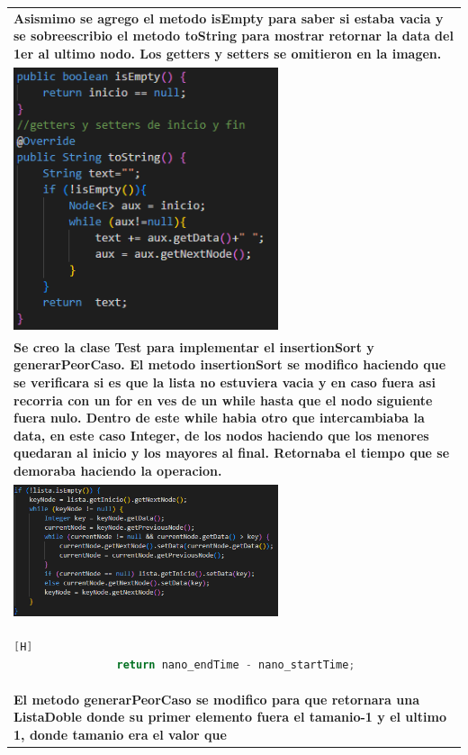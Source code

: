 \documentclass{article}
\begin{document}
\begin{longtable}{|p{15cm}|}
			\textbf{Asismimo se agrego el metodo isEmpty para saber si estaba vacia 
			y se sobreescribio el metodo toString para mostrar retornar la data 
			del 1er al ultimo nodo. Los getters y setters se omitieron en la imagen.}\\
			\includegraphics[width=0.6\textwidth,keepaspectratio]{img/otros.png}\\
			\textbf{Se creo la clase Test  para implementar el insertionSort y generarPeorCaso.
			El metodo insertionSort se modifico haciendo que se verificara si es que 
			la lista no estuviera vacia y en caso fuera asi recorria con un 
			for en ves de un while hasta que el nodo siguiente fuera nulo. Dentro de este while
			habia otro que intercambiaba la data, en este caso Integer, de los nodos
			haciendo que los menores quedaran al inicio y los mayores al final. Retornaba
			el tiempo que se demoraba haciendo la operacion.}\\
			\includegraphics[width=0.6\textwidth,keepaspectratio]{img/insertionSort.png}\\
			\begin{lstlisting}[language=Java,caption={Retorno de insertionSort}][H]
				return nano_endTime - nano_startTime;
			\end{lstlisting}\\
			\textbf{El metodo generarPeorCaso se modifico para que retornara una ListaDoble donde su
			primer elemento fuera el tamanio-1 y el ultimo 1, donde tamanio era el valor que 
}
\end{longtable}
\end{document}
